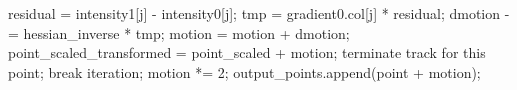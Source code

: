 \documentclass[11pt]{easychair}
\begin{document}
\begin{appendices}
\begin{algorithm}[h]
\begin{algorithmic}[1]
			\State residual = intensity1[j] - intensity0[j];
			\State tmp = gradient0.col[j] * residual;
			\State dmotion -= hessian\_inverse * tmp;
			\EndFor
			\State motion = motion + dmotion;
			\State point\_scaled\_transformed = point\_scaled + motion;
			\State terminate track for this point;
			\EndIf
			\State break iteration;
			\EndIf
			\EndFor
			\State motion *= 2;      
			\EndFor 
			\State output\_points.append(point + motion);
			\EndFor 
		\end{algorithmic}  
		
	\end{algorithm}  
	
\end{appendices}


%
%
%
%
%
\end{document}
